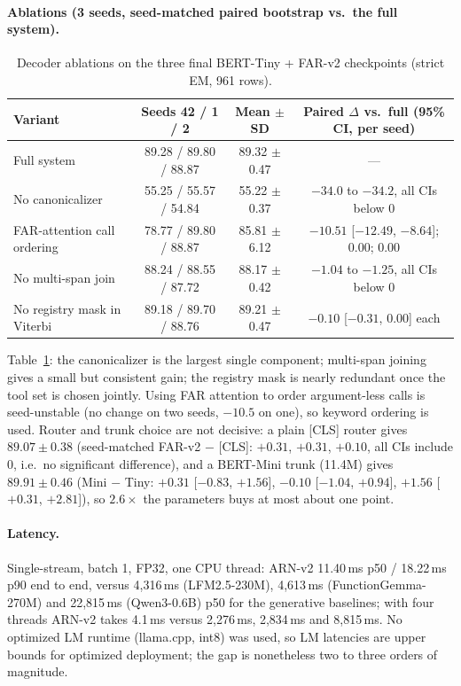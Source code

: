 \documentclass[11pt]{article}
\newcommand{\arn}{ARN-v2}
\begin{document}
\paragraph{Ablations (3 seeds, seed-matched paired bootstrap vs.\ the full system).}
\begin{table}[t]\centering\small
\caption{Decoder ablations on the three final BERT-Tiny + FAR-v2 checkpoints (strict EM, 961 rows).}
\label{tab:abl}
\begin{tabular}{lccc}\toprule
Variant & Seeds 42 / 1 / 2 & Mean $\pm$ SD & Paired $\Delta$ vs.\ full (95\% CI, per seed)\\\midrule
Full system & 89.28 / 89.80 / 88.87 & 89.32 $\pm$ 0.47 & ---\\
No canonicalizer & 55.25 / 55.57 / 54.84 & 55.22 $\pm$ 0.37 & $-34.0$ to $-34.2$, all CIs below 0\\
FAR-attention call ordering & 78.77 / 89.80 / 88.87 & 85.81 $\pm$ 6.12 & $-10.51$ [$-12.49$, $-8.64$]; 0.00; 0.00\\
No multi-span join & 88.24 / 88.55 / 87.72 & 88.17 $\pm$ 0.42 & $-1.04$ to $-1.25$, all CIs below 0\\
No registry mask in Viterbi & 89.18 / 89.70 / 88.76 & 89.21 $\pm$ 0.47 & $-0.10$ [$-0.31$, $0.00$] each\\\bottomrule
\end{tabular}\end{table}
Table~\ref{tab:abl}: the canonicalizer is the largest single component; multi-span joining gives a small but
consistent gain; the registry mask is nearly redundant once the tool set is chosen jointly. Using FAR attention
to order argument-less calls is seed-unstable (no change on two seeds, $-10.5$ on one), so keyword ordering is
used. Router and trunk choice are not decisive: a plain [CLS] router gives $89.07 \pm 0.38$ (seed-matched
FAR-v2 $-$ [CLS]: $+0.31$, $+0.31$, $+0.10$, all CIs include 0, i.e.\ no significant difference), and a
BERT-Mini trunk (11.4M) gives $89.91 \pm 0.46$ (Mini $-$ Tiny: $+0.31$ [$-0.83$, $+1.56$], $-0.10$
[$-1.04$, $+0.94$], $+1.56$ [$+0.31$, $+2.81$]), so $2.6\times$ the parameters buys at most about one point.

\paragraph{Latency.} Single-stream, batch 1, FP32, one CPU thread: \arn{} 11.40\,ms p50 / 18.22\,ms p90
end to end, versus 4,316\,ms (LFM2.5-230M), 4,613\,ms (FunctionGemma-270M) and 22,815\,ms (Qwen3-0.6B)
p50 for the generative baselines; with four threads \arn{} takes 4.1\,ms versus 2,276\,ms, 2,834\,ms and
8,815\,ms. No optimized LM runtime (llama.cpp, int8) was used, so LM latencies are upper bounds for
optimized deployment; the gap is nonetheless two to three orders of magnitude.
\end{document}
